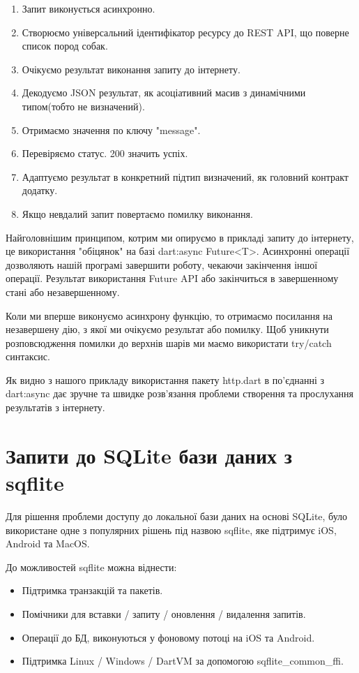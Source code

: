 \begin{enumerate}
    \item Запит виконується асинхронно.
    \item Створюємо універсальний ідентифікатор ресурсу до REST API, що поверне список пород собак.
    \item Очікуємо результат виконання запиту до інтернету.
    \item Декодуємо JSON результат, як асоціативний масив з динамічними типом(тобто не визначений).
    \item Отримаємо значення по ключу "message".
    \item Перевіряємо статус. 200 значить успіх.
    \item Адаптуємо результат в конкретний підтип визначений, як головний контракт додатку.
    \item Якщо невдалий запит повертаємо помилку виконання.
\end{enumerate}

Найголовнішим принципом, котрим ми опируємо в прикладі запиту до інтернету, це використання "обіцянок" на базі dart:async Future<T>.
Асинхронні операції дозволяють нашій програмі завершити роботу, чекаючи закінчення іншої операції.
Результат використання Future API або закінчиться в завершенному стані або незавершенному.

Коли ми вперше виконуємо асинхрону функцію, то отримаємо посилання на незавершену дію, з якої ми очікуємо результат або помилку.
Щоб уникнути розповсюдження помилки до верхнів шарів ми маємо використати try/catch синтаксис.

Як видно з нашого прикладу використання пакету http.dart в по'єднанні з dart:async дає зручне та швидке розв'язання проблеми створення та прослухання результатів з інтернету.


\section{Запити до SQLite бази даних з sqflite}
\label{section.2.4}
Для рішення проблеми доступу до локальної бази даних на основі SQLite,
було використане одне з популярних рішень під назвою sqflite, яке підтримує iOS, Android та MacOS.

До можливостей sqflite можна віднести:

\begin{itemize}
    \item Підтримка транзакцій та пакетів.
    \item Помічники для вставки / запиту / оновлення / видалення запитів.
    \item Операції до БД, виконуються у фоновому потоці на iOS та Android.
    \item Підтримка Linux / Windows / DartVM за допомогою sqflite_common_ffi.
\end{itemize}

